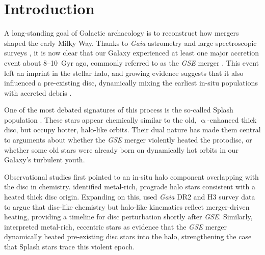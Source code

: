 \documentclass[fleqn,usenatbib]{mnras}
\begin{document}
\section{Introduction}
\label{sec:introduction}

A long-standing goal of Galactic archaeology is to reconstruct how mergers shaped the early Milky Way. Thanks to \textit{Gaia} astrometry \citep{Brown2021b} and large spectroscopic surveys \citep{Jofre2019}, it is now clear that our Galaxy experienced at least one major accretion event about 8--10~Gyr ago, commonly referred to as the \textit{GSE} merger \citep{Haywood2018b, Belokurov2018, Helmi2018, Naidu2020}. This event left an imprint in the stellar halo, and growing evidence suggests that it also influenced a pre-existing disc, dynamically mixing the earliest in-situ populations with accreted debris \citep{Helmi2020}.

One of the most debated signatures of this process is the so-called Splash population \citep{Belokurov2020, Belokurov2022}. These stars appear chemically similar to the old, $\upalpha$-enhanced thick disc, but occupy hotter, halo-like orbits. Their dual nature has made them central to arguments about whether the \textit{GSE} merger violently heated the protodisc, or whether some old stars were already born on dynamically hot orbits in our Galaxy’s turbulent youth.

Observational studies first pointed to an in-situ halo component overlapping with the disc in chemistry. \citet{Bonaca2017} identified metal-rich, prograde halo stars consistent with a heated thick disc origin. Expanding on this, \citet{Bonaca2020} used \textit{Gaia} DR2 and H3 survey data to argue that disc-like chemistry but halo-like kinematics reflect merger-driven heating, providing a timeline for disc perturbation shortly after \textit{GSE}. Similarly, \citet{DiMatteo2019,DiMatteo2020} interpreted metal-rich, eccentric stars as evidence that the \textit{GSE} merger dynamically heated pre-existing disc stars into the halo, strengthening the case that Splash stars trace this violent epoch.
\end{document}
